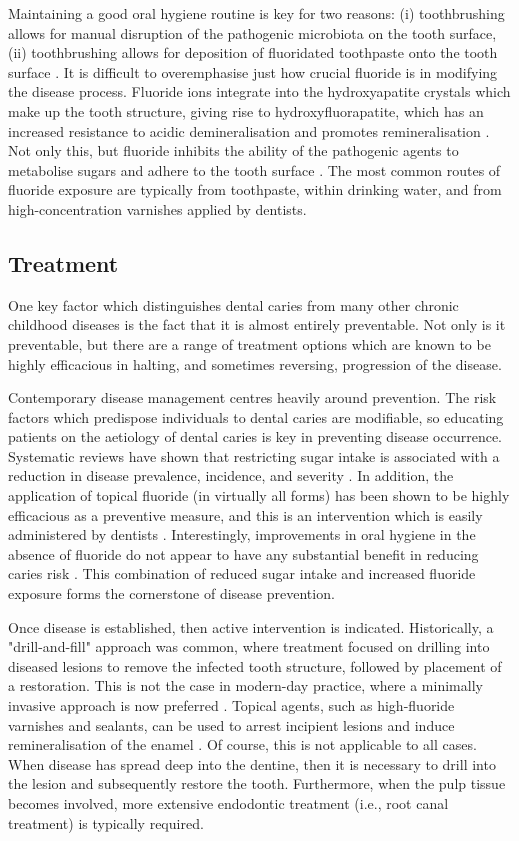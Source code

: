 Maintaining a good oral hygiene routine is key for two reasons: (i) toothbrushing allows for manual disruption of the pathogenic microbiota on the tooth surface, (ii) toothbrushing allows for deposition of fluoridated toothpaste onto the tooth surface \citep{pitts2017}. It is difficult to overemphasise just how crucial fluoride is in modifying the disease process. Fluoride ions integrate into the hydroxyapatite crystals which make up the tooth structure, giving rise to hydroxyfluorapatite, which has an increased resistance to acidic demineralisation and promotes remineralisation \citep{buzalaf2011}. Not only this, but fluoride inhibits the ability of the pathogenic agents to metabolise sugars and adhere to the tooth surface \citep{buzalaf2011, liao2017}. The most common routes of fluoride exposure are typically from toothpaste, within drinking water, and from high-concentration varnishes applied by dentists.

\subsection{Treatment}

One key factor which distinguishes dental caries from many other chronic childhood diseases is the fact that it is almost entirely preventable. Not only is it preventable, but there are a range of treatment options which are known to be highly efficacious in halting, and sometimes reversing, progression of the disease.

Contemporary disease management centres heavily around prevention. The risk factors which predispose individuals to dental caries are modifiable, so educating patients on the aetiology of dental caries is key in preventing disease occurrence. Systematic reviews have shown that restricting sugar intake is associated with a reduction in disease prevalence, incidence, and severity \citep{moynihan2017}. In addition, the application of topical fluoride (in virtually all forms) has been shown to be highly efficacious as a preventive measure, and this is an intervention which is easily administered by dentists \citep{weyant2013}. Interestingly, improvements in oral hygiene in the absence of fluoride do not appear to have any substantial benefit in reducing caries risk \citep{hujoel2018}. This combination of reduced sugar intake and increased fluoride exposure forms the cornerstone of disease prevention. 

Once disease is established, then active intervention is indicated. Historically, a "drill-and-fill" approach was common, where treatment focused on drilling into diseased lesions to remove the infected tooth structure, followed by placement of a restoration. This is not the case in modern-day practice, where a minimally invasive approach is now preferred \citep{walsh2013}. Topical agents, such as high-fluoride varnishes and sealants, can be used to arrest incipient lesions and induce remineralisation of the enamel \citep{walsh2013}. Of course, this is not applicable to all cases. When disease has spread deep into the dentine, then it is necessary to drill into the lesion and subsequently restore the tooth. Furthermore, when the pulp tissue becomes involved, more extensive endodontic treatment (i.e., root canal treatment) is typically required.

